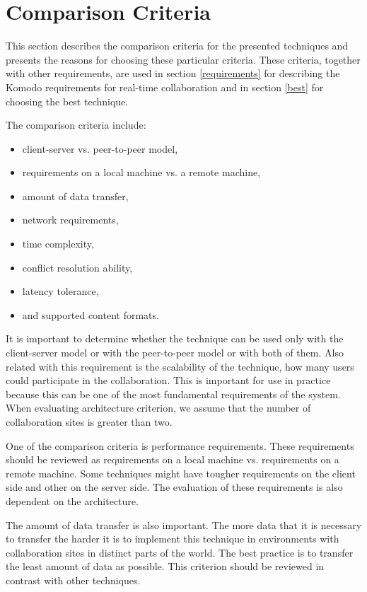 \documentclass[12pt,oneside]{fithesis2}
\begin{document}
\section{Comparison Criteria} \label{comparison}
This section describes the comparison criteria for the presented techniques and presents the reasons for choosing these particular criteria. These criteria, together with other requirements, are used in section \ref{requirements} for describing the Komodo requirements for real-time collaboration and in section \ref{best} for choosing the best technique.
\par The comparison criteria include:
\begin{itemize}
\item client-server vs. peer-to-peer model,
\item requirements on a local machine vs. a remote machine,
\item amount of data transfer,
\item network requirements,
\item time complexity,
\item conflict resolution ability,
\item latency tolerance,
\item and supported content formats.
\end{itemize}
\par It is important to determine whether the technique can be used only with the client-server model or with the peer-to-peer model or with both of them. Also related with this requirement is the scalability of the technique, how many users could participate in the collaboration. This is important for use in practice because this can be one of the most fundamental requirements of the system. When evaluating architecture criterion, we assume that the number of collaboration sites is greater than two.
\par One of the comparison criteria is performance requirements. These requirements should be reviewed as requirements on a local machine vs. requirements on a remote machine. Some techniques might have tougher requirements on the client side and other on the server side. The evaluation of these requirements is also dependent on the architecture.
\par The amount of data transfer is also important. The more data that it is necessary to transfer the harder it is to implement this technique in environments with collaboration sites in distinct parts of the world. The best practice is to transfer the least amount of data as possible. This criterion should be reviewed in contrast with other techniques.
\end{document}
